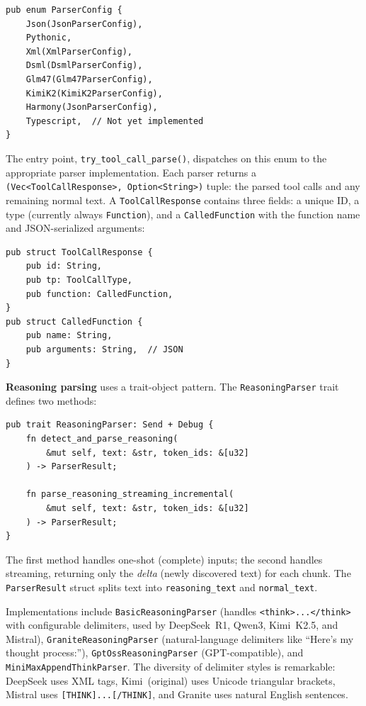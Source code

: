 \begin{verbatim}
pub enum ParserConfig {
    Json(JsonParserConfig),
    Pythonic,
    Xml(XmlParserConfig),
    Dsml(DsmlParserConfig),
    Glm47(Glm47ParserConfig),
    KimiK2(KimiK2ParserConfig),
    Harmony(JsonParserConfig),
    Typescript,  // Not yet implemented
}
\end{verbatim}

The entry point, \texttt{try\_tool\_call\_parse()}, dispatches on this enum to the appropriate parser implementation. Each parser returns a \texttt{(Vec<ToolCallResponse>, Option<String>)} tuple: the parsed tool calls and any remaining normal text. A \texttt{ToolCallResponse} contains three fields: a unique ID, a type (currently always \texttt{Function}), and a \texttt{CalledFunction} with the function name and JSON-serialized arguments:

\begin{verbatim}
pub struct ToolCallResponse {
    pub id: String,
    pub tp: ToolCallType,
    pub function: CalledFunction,
}
pub struct CalledFunction {
    pub name: String,
    pub arguments: String,  // JSON
}
\end{verbatim}

\textbf{Reasoning parsing} uses a trait-object pattern. The \texttt{ReasoningParser} trait defines two methods:

\begin{verbatim}
pub trait ReasoningParser: Send + Debug {
    fn detect_and_parse_reasoning(
        &mut self, text: &str, token_ids: &[u32]
    ) -> ParserResult;

    fn parse_reasoning_streaming_incremental(
        &mut self, text: &str, token_ids: &[u32]
    ) -> ParserResult;
}
\end{verbatim}

The first method handles one-shot (complete) inputs; the second handles streaming, returning only the \emph{delta} (newly discovered text) for each chunk. The \texttt{Parser\-Result} struct splits text into \texttt{reasoning\_text} and \texttt{normal\_text}.

Implementations include \texttt{Basic\-Reasoning\-Parser} (handles \texttt{<think>...\allowbreak </think>} with configurable delimiters, used by DeepSeek~R1, Qwen3, Kimi~K2.5, and Mistral), \texttt{Granite\-Reasoning\-Parser} (natural-language delimiters like ``Here's my thought process:''), \texttt{GptOss\-Reasoning\-Parser} (GPT-compatible), and \texttt{MiniMax\-Append\-Think\-Parser}. The diversity of delimiter styles is remarkable: DeepSeek uses XML tags, Kimi~(original) uses Unicode triangular brackets, Mistral uses \texttt{[THINK]...[/THINK]}, and Granite uses natural English sentences.

